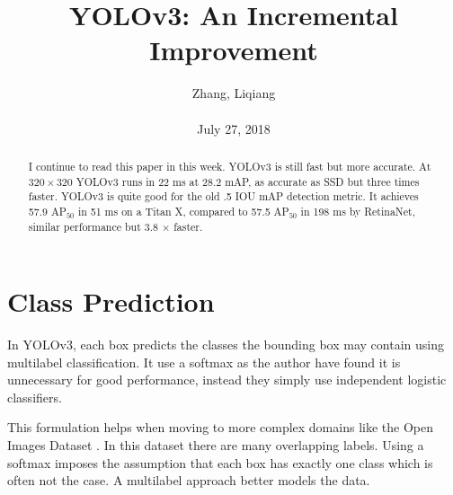 \documentclass[10pt,twocolumn,letterpaper]{article}
\title{\textbf{YOLOv3: An Incremental Improvement}}
\author{Zhang, Liqiang\\\\July 27, 2018}
\begin{document}
\maketitle
\par
\begin{abstract}
I continue to read this paper in this week. YOLOv3 is still fast but more accurate. At $320\times 320$ YOLOv3 runs in 22 ms at 28.2 mAP, as accurate as SSD but three times faster. YOLOv3 is quite good for the old .5 IOU mAP detection metric. It achieves 57.9 AP$_{50}$ in 51 ms on a Titan X, compared to 57.5 AP$_{50}$ in 198 ms by RetinaNet, similar performance but 3.8 $\times$ faster. 
\end{abstract}
\section{Class Prediction}
In YOLOv3, each box predicts the classes the bounding box may contain using multilabel classification. It use a softmax as the author have found it is unnecessary for good performance, instead they simply use independent logistic classifiers.
\par 
This formulation helps when moving to more complex domains like the Open Images Dataset \cite{Lin2016Feature}. In this dataset there are many overlapping labels. Using a softmax imposes the assumption that each box has exactly one class which is often not the case. A multilabel approach better models the data.
\end{document}
